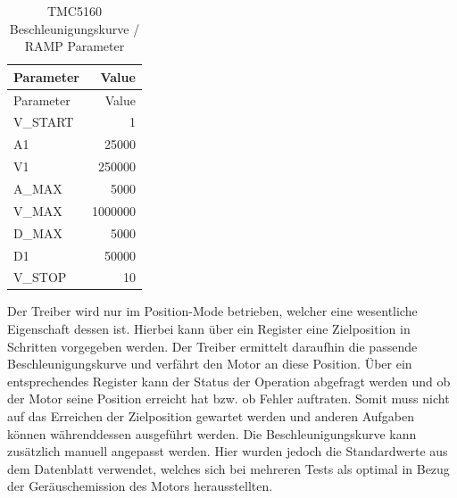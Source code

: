 \begin{longtable}[]{@{}lr@{}}
\caption{TMC5160 Beschleunigungskurve / RAMP Parameter
\label{tmcrampparams}}\tabularnewline
\toprule
Parameter & Value\tabularnewline
\midrule
\endfirsthead
\toprule
Parameter & Value\tabularnewline
\midrule
\endhead
V\_START & 1\tabularnewline
A1 & 25000\tabularnewline
V1 & 250000\tabularnewline
A\_MAX & 5000\tabularnewline
V\_MAX & 1000000\tabularnewline
D\_MAX & 5000\tabularnewline
D1 & 50000\tabularnewline
V\_STOP & 10\tabularnewline
\bottomrule
\end{longtable}

Der Treiber wird nur im Position-Mode betrieben, welcher eine
wesentliche Eigenschaft dessen ist. Hierbei kann über ein Register eine
Zielposition in Schritten vorgegeben werden. Der Treiber ermittelt
daraufhin die passende Beschleunigungskurve und verfährt den Motor an
diese Position. Über ein entsprechendes Register kann der Status der
Operation abgefragt werden und ob der Motor seine Position erreicht hat
bzw. ob Fehler auftraten. Somit muss nicht auf das Erreichen der
Zielposition gewartet werden und anderen Aufgaben können währenddessen
ausgeführt werden. Die Beschleunigungskurve kann zusätzlich manuell
angepasst werden. Hier wurden jedoch die Standardwerte aus dem
Datenblatt verwendet, welches sich bei mehreren Tests als optimal in
Bezug der Geräuschemission des Motors herausstellten.

